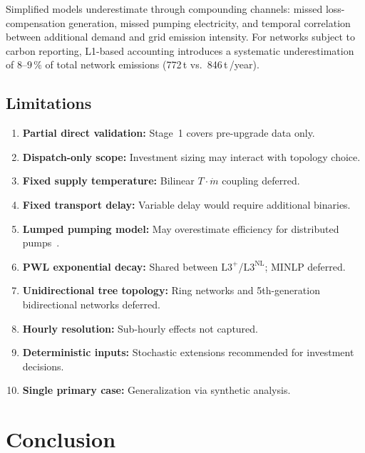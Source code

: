 \documentclass[review,3p]{elsarticle}
\newcommand{\Lplus}{\mathrm{L3}^{+}}
\newcommand{\Lnl}{\mathrm{L3}^{\mathrm{NL}}}
\begin{document}
Simplified models underestimate  through compounding
channels: missed loss-compensation generation, missed pumping
electricity, and temporal correlation between additional demand and
grid emission intensity. For networks subject to carbon reporting,
L1-based accounting introduces a systematic underestimation of
$8$--$9\,\%$ of total network emissions (772\,t vs.\ 846\,t\,/year).

\subsection{Limitations}
\label{sec:discussion_limitations}

\begin{enumerate}[nosep]
  \item \textbf{Partial direct validation:} Stage~1 covers
        pre-upgrade data only.
  \item \textbf{Dispatch-only scope:} Investment sizing may interact
        with topology choice.
  \item \textbf{Fixed supply temperature:} Bilinear
        $T \cdot \dot{m}$ coupling deferred.
  \item \textbf{Fixed transport delay:} Variable delay would require
        additional binaries.
  \item \textbf{Lumped pumping model:} May overestimate efficiency for
        distributed pumps~\cite{Hari2024}.
  \item \textbf{PWL exponential decay:} Shared between
        $\Lplus$/$\Lnl$; MINLP deferred.
  \item \textbf{Unidirectional tree topology:} Ring networks and
        5th-generation bidirectional networks deferred.
  \item \textbf{Hourly resolution:} Sub-hourly effects not captured.
  \item \textbf{Deterministic inputs:} Stochastic extensions
        recommended for investment decisions.
  \item \textbf{Single primary case:} Generalization via synthetic
        analysis.
\end{enumerate}

\section{Conclusion}
\label{sec:conclusion}
\end{document}
